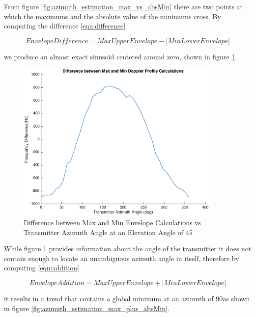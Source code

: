 From figure \ref{fig:azimuth_estimation_max_vs_absMin} there are two points at which the maximums and the absolute value of the minimums cross. By computing the difference \ref{eqn:difference}

\begin{equation}
	 Envelope Difference = Max Upper Envelope - | Min Lower Envelope |
	 \label{eqn:difference}
\end{equation}

we produce an almost exact sinusoid centered around zero, shown in figure \ref{fig:azimuth_estimation_difference}.

 \begin{figure}
	\begin{center}
		\includegraphics[width=10cm]{images/results/Azimuth_angle_estimation_difference.eps}
		\caption{Difference between Max and Min Envelope Calculations vs Transmitter Azimuth Angle at an Elevation Angle of 45\textdegree}
		\label{fig:azimuth_estimation_difference}
	\end{center}
\end{figure}

While figure \ref{fig:azimuth_estimation_difference} provides information about the angle of the transmitter it does not contain enough to locate an unambiguous azimuth angle in itself, therefore by computing \ref{eqn:addition}

\begin{equation}
	 Envelope Addition = Max Upper Envelope + | Min Lower Envelope |
	 \label{eqn:addition}
\end{equation}

it results in a trend that contains a global minimum at an azimuth of 90\textdegree \space as shown in figure \ref{fig:azimuth_estimation_max_plus_absMin}. 

